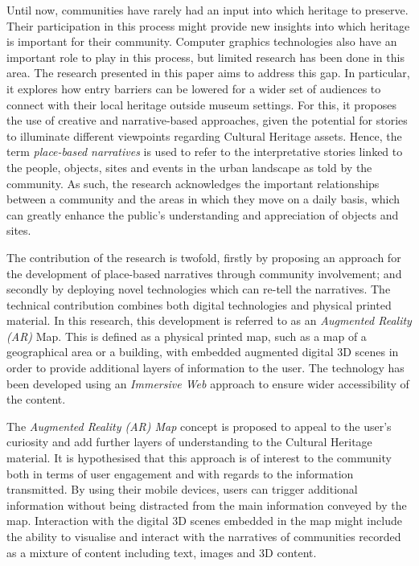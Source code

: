 \documentclass{egpubl}
\begin{document}
Until now, communities have rarely had an input into which heritage to preserve.
Their participation in this process might provide new insights into which
heritage is important for their community. Computer graphics technologies also
have an important role to play in this process, but limited research has
been done in this area. The research presented in this paper aims to address
this gap. In particular, it explores how entry barriers can be lowered for a
wider set of audiences to connect with their local heritage outside museum
settings. For this, it proposes the use of creative and narrative-based
approaches, given the potential for stories to illuminate different viewpoints
regarding Cultural Heritage assets. Hence, the term \textit{place-based
narratives} is used to refer to the interpretative stories linked to the
people, objects, sites and events in the urban landscape as told by the
community. As such, the research acknowledges the important relationships
between a community and the areas in which they move on a daily basis, which
can greatly enhance the public's understanding and appreciation of objects and
sites. 

The contribution of the research is twofold, firstly by proposing an approach for
the development of place-based narratives through community involvement; and
secondly by deploying novel technologies which can re-tell the
narratives. The technical contribution combines both digital technologies and
physical printed material. In this research, this development is referred to
as an \emph{Augmented Reality (AR)} Map. This is defined as a physical printed
map, such as a map of a geographical area or a building, with embedded
augmented digital 3D scenes in order to provide additional layers of
information to the user. The technology has been developed using an
\emph{Immersive Web} approach to ensure wider accessibility of the content.

The \emph{Augmented Reality (AR) Map} concept is proposed to appeal to the
user's curiosity and add further layers of understanding to the Cultural
Heritage material. It is hypothesised that this approach is of interest to the
community both in terms of user engagement and with regards to the information
transmitted. By using their mobile devices, users can trigger additional
information without being distracted from the main information conveyed by the
map. Interaction with the digital 3D scenes embedded in the map might include
the ability to visualise and interact with the narratives of communities
recorded as a mixture of content including text, images and 3D content. 
\end{document}

